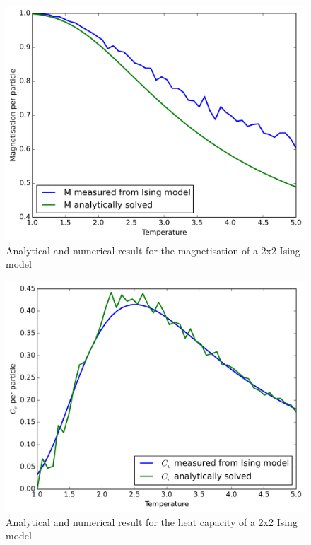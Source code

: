 \documentclass[11pt,a4paper,english,draft]{article}
\numberwithin{equation}{section}
\newcommand{\figurewidth}{.85\textwidth}
\begin{document}
\begin{figure}
\centering
\includegraphics[width=\figurewidth]{pics/pics4report/aM.png}
\caption{Analytical and numerical result for the magnetisation 
of a 2x2 Ising model}
\label{fig:aM}
\end{figure}

\begin{figure}
\centering
\includegraphics[width=\figurewidth]{pics/pics4report/acv.png}
\caption{Analytical and numerical result for the heat capacity 
of a 2x2 Ising model}
\label{fig:acv}
\end{figure}
\end{document}
